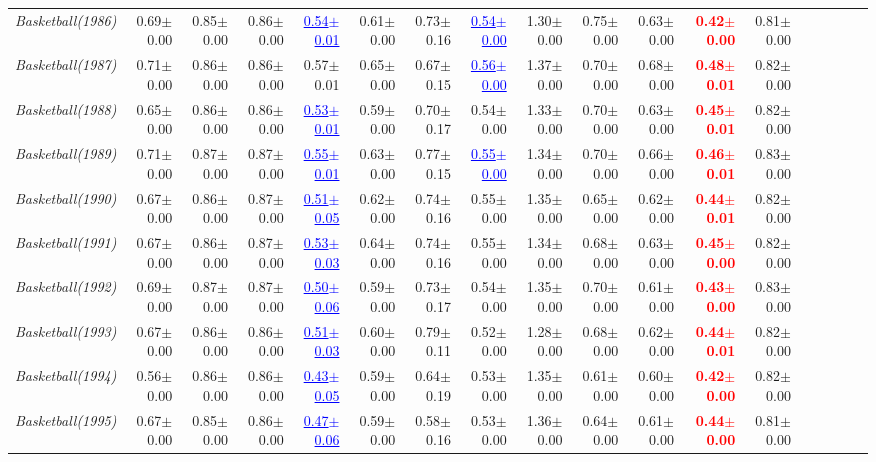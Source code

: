 \documentclass[nohyperref]{article}
\theoremstyle{plain}
\theoremstyle{definition}
\theoremstyle{remark}
\newcommand{\red}[1]{\textcolor{red}{\textbf{#1}}}
\newcommand{\blue}[1]{\textcolor{blue}{\underline{#1}}}
\begin{document}
\begin{table*}[!ht]
{\begin{tabular}{lrrrrrrrrrrrrrrrrr}
			{\it Basketball(1986)} & 0.69$\pm$0.00 & 0.85$\pm$0.00 & 0.86$\pm$0.00 & \blue{0.54$\pm$0.01} & 0.61$\pm$0.00 & 0.73$\pm$0.16 & \blue{0.54$\pm$0.00} & 1.30$\pm$0.00 & 0.75$\pm$0.00 & 0.63$\pm$0.00 & \red{0.42$\pm$0.00} & 0.81$\pm$0.00 \\
			{\it Basketball(1987)} & 0.71$\pm$0.00 & 0.86$\pm$0.00 & 0.86$\pm$0.00 & 0.57$\pm$0.01 & 0.65$\pm$0.00 & 0.67$\pm$0.15 & \blue{0.56$\pm$0.00} & 1.37$\pm$0.00 & 0.70$\pm$0.00 & 0.68$\pm$0.00 & \red{0.48$\pm$0.01} & 0.82$\pm$0.00 \\
			{\it Basketball(1988)} & 0.65$\pm$0.00 & 0.86$\pm$0.00 & 0.86$\pm$0.00 & \blue{0.53$\pm$0.01} & 0.59$\pm$0.00 & 0.70$\pm$0.17 & 0.54$\pm$0.00 & 1.33$\pm$0.00 & 0.70$\pm$0.00 & 0.63$\pm$0.00 & \red{0.45$\pm$0.01} & 0.82$\pm$0.00 \\
			{\it Basketball(1989)} & 0.71$\pm$0.00 & 0.87$\pm$0.00 & 0.87$\pm$0.00 & \blue{0.55$\pm$0.01} & 0.63$\pm$0.00 & 0.77$\pm$0.15 & \blue{0.55$\pm$0.00} & 1.34$\pm$0.00 & 0.70$\pm$0.00 & 0.66$\pm$0.00 & \red{0.46$\pm$0.01} & 0.83$\pm$0.00 \\
			{\it Basketball(1990)} & 0.67$\pm$0.00 & 0.86$\pm$0.00 & 0.87$\pm$0.00 & \blue{0.51$\pm$0.05} & 0.62$\pm$0.00 & 0.74$\pm$0.16 & 0.55$\pm$0.00 & 1.35$\pm$0.00 & 0.65$\pm$0.00 & 0.62$\pm$0.00 & \red{0.44$\pm$0.01} & 0.82$\pm$0.00 \\
			{\it Basketball(1991)} & 0.67$\pm$0.00 & 0.86$\pm$0.00 & 0.87$\pm$0.00 & \blue{0.53$\pm$0.03} & 0.64$\pm$0.00 & 0.74$\pm$0.16 & 0.55$\pm$0.00 & 1.34$\pm$0.00 & 0.68$\pm$0.00 & 0.63$\pm$0.00 & \red{0.45$\pm$0.00} & 0.82$\pm$0.00 \\
			{\it Basketball(1992)} & 0.69$\pm$0.00 & 0.87$\pm$0.00 & 0.87$\pm$0.00 & \blue{0.50$\pm$0.06} & 0.59$\pm$0.00 & 0.73$\pm$0.17 & 0.54$\pm$0.00 & 1.35$\pm$0.00 & 0.70$\pm$0.00 & 0.61$\pm$0.00 & \red{0.43$\pm$0.00} & 0.83$\pm$0.00 \\
			{\it Basketball(1993)} & 0.67$\pm$0.00 & 0.86$\pm$0.00 & 0.86$\pm$0.00 & \blue{0.51$\pm$0.03} & 0.60$\pm$0.00 & 0.79$\pm$0.11 & 0.52$\pm$0.00 & 1.28$\pm$0.00 & 0.68$\pm$0.00 & 0.62$\pm$0.00 & \red{0.44$\pm$0.01} & 0.82$\pm$0.00 \\
			{\it Basketball(1994)} & 0.56$\pm$0.00 & 0.86$\pm$0.00 & 0.86$\pm$0.00 & \blue{0.43$\pm$0.05} & 0.59$\pm$0.00 & 0.64$\pm$0.19 & 0.53$\pm$0.00 & 1.35$\pm$0.00 & 0.61$\pm$0.00 & 0.60$\pm$0.00 & \red{0.42$\pm$0.00} & 0.82$\pm$0.00 \\
			{\it Basketball(1995)} & 0.67$\pm$0.00 & 0.85$\pm$0.00 & 0.86$\pm$0.00 & \blue{0.47$\pm$0.06} & 0.59$\pm$0.00 & 0.58$\pm$0.16 & 0.53$\pm$0.00 & 1.36$\pm$0.00 & 0.64$\pm$0.00 & 0.61$\pm$0.00 & \red{0.44$\pm$0.00} & 0.81$\pm$0.00 \\

\end{tabular}}
\end{table*}
\end{document}
